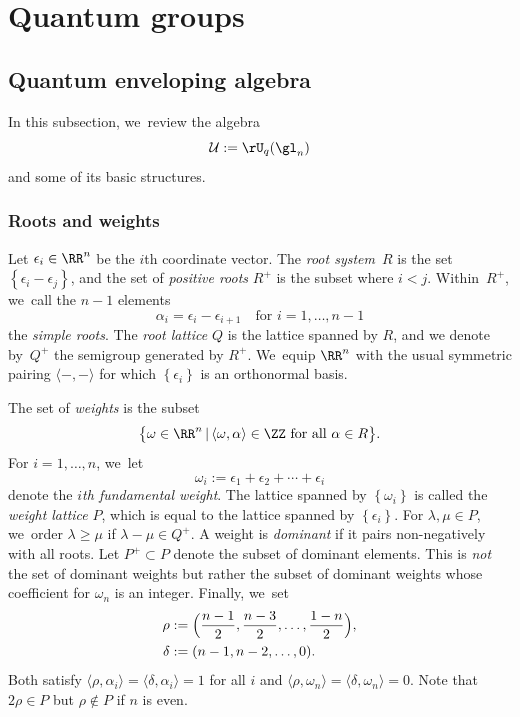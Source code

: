 \section{Quantum groups}

\subsection{Quantum enveloping algebra}
In this subsection, we~review the algebra
\[
\mathcal{U}:=\rU_q(\gl_n)
\]
and some of its basic structures.

\subsubsection{Roots and weights}
Let $\epsilon_i\in \RR^n$ be the $i$th coordinate vector.
The \textit{root system}~$R$ is the set $\left\{ \epsilon_i-\epsilon_j \right\}$, and the set of \textit{positive roots} $R^+$ is the subset where $i<j$.
Within~$R^+$, we~call the $n-1$ elements
\[
\alpha_i=\epsilon_i-\epsilon_{i+1}\quad\text{for }i=1,\ldots, n-1
\]
the \textit{simple roots}.
The \textit{root lattice} $Q$ is the lattice spanned by $R$, and we denote by~$Q^+$ the semigroup generated by $R^+$. We~equip $\RR^n$ with the usual symmetric pairing $\langle-,-\rangle$ for which $\left\{ \epsilon_i \right\}$ is an orthonormal basis.

The set of \textit{weights} is the subset
\[
\bigl\{ \omega\in\RR^n\, |\, \langle\omega,\alpha\rangle\in\ZZ\hbox{ for all }\alpha\in R \bigr\}.
\]
For $i=1,\ldots, n$, we~let
\[
\omega_i:=\epsilon_1+\epsilon_2+\cdots+\epsilon_i
\]
denote the \textit{$i$th fundamental weight}.
The lattice spanned by $\left\{ \omega_i \right\}$ is called the \textit{weight lattice} $P$, which is equal to the lattice spanned by $\left\{ \epsilon_i \right\}$.
For $\lambda, \mu\in P$, we~order $\lambda\ge\mu$ if $\lambda-\mu\in Q^+$.
A weight is \textit{dominant} if it pairs non-negatively with all roots.
Let $P^+\subset P$ denote the subset of dominant elements.
This is \textit{not} the set of dominant weights but rather the subset of dominant weights whose coefficient for $\omega_n$ is an integer.
Finally, we~set
\begin{align*}
\rho&:=\Bigl(\frac{n-1}{2}, \frac{n-3}{2},\ldots,\frac{1-n}{2} \Bigr),\\
\delta&:=(n-1, n-2,\ldots, 0).
\end{align*}
Both satisfy $\langle\rho, \alpha_i\rangle =\langle\delta,\alpha_i\rangle=1$ for all $i$ and $\langle\rho,\omega_n\rangle=\langle \delta,\omega_n\rangle=0$.
Note that $2\rho\in P$ but $\rho\not\in P$ if $n$ is even.

